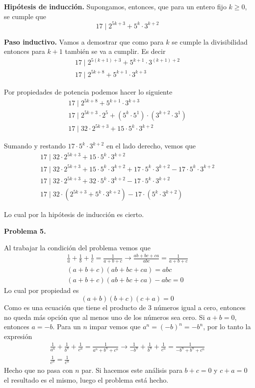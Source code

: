 \textbf{Hipótesis de inducción.} Supongamos, entonces, que para un entero fijo $k \geq 0$, se cumple que
\[17 \mid 2^{5k + 3} + 5^{k} \cdot 3^{k + 2}\]

\textbf{Paso inductivo.} Vamos a demostrar que como para $k$ se cumple la divisibilidad entonces para $k + 1$ también se va a cumplir.
Es decir
\begin{gather*}
    17 \mid 2^{5(k + 1) + 3} + 5^{k + 1} \cdot 3^{(k + 1) + 2}\\
    17 \mid 2^{5k + 8} + 5^{k + 1} \cdot 3^{k + 3}
\end{gather*}

Por propiedades de potencia podemos hacer lo siguiente
\begin{gather*}
    17 \mid 2^{5k + 8} + 5^{k + 1} \cdot 3^{k + 3}\\
    17 \mid 2^{5k + 3} \cdot 2^5 + (5^{k} \cdot 5^1) \cdot (3^{k + 2} \cdot 3^1)\\
    17 \mid 32\cdot 2^{5k + 3} + 15\cdot 5^{k} \cdot 3^{k + 2}
\end{gather*}

Sumando y restando $17\cdot 5^{k} \cdot 3^{k + 2}$ en el lado derecho, vemos que
\begin{gather*}
    17 \mid 32\cdot 2^{5k + 3} + 15\cdot 5^{k} \cdot 3^{k + 2} \\
    17 \mid 32\cdot 2^{5k + 3} + 15\cdot 5^{k} \cdot 3^{k + 2} + 17\cdot 5^{k} \cdot 3^{k + 2} - 17\cdot 5^{k} \cdot 3^{k + 2}\\
    17 \mid 32\cdot 2^{5k + 3} + 32\cdot 5^{k} \cdot 3^{k + 2} - 17\cdot 5^{k} \cdot 3^{k + 2}\\
    \boxed{17 \mid 32\cdot (2^{5k + 3} + 5^{k} \cdot 3^{k + 2}) - 17\cdot (5^{k} \cdot 3^{k + 2})}
\end{gather*}

Lo cual por la hipótesis de inducción es cierto.

\textbf{Problema 5.}

Al trabajar la condición del problema vemos que
\begin{gather*}
    \frac{1}{a} + \frac{1}{b} + \frac{1}{c} = \frac{1}{a + b + c}\rightarrow
    \frac{ab + bc + ca}{abc} = \frac{1}{a + b + c}\\
    (a + b + c)(ab + bc + ca) = abc\\
    (a + b + c)(ab + bc + ca) - abc = 0
\end{gather*}
Lo cual por propiedad es
\[(a + b)(b + c)(c + a) = 0\]
Como es una ecuación que tiene el producto de 3 números igual a cero, entonces no queda más opción que al menos uno de los números sea cero.
Si $a + b = 0$, entonces $a = -b$.
Para un $n$ impar vemos que $a^n = (-b)^n = - b^n$, por lo tanto la expresión
\begin{gather*}
    \frac{1}{a^n} + \frac{1}{b^n} + \frac{1}{c^n} = \frac{1}{a^n + b^n + c^n}\rightarrow
    \frac{1}{-b^n} + \frac{1}{b^n} + \frac{1}{c^n} = \frac{1}{-b^n + b^n + c^n}\\
    \boxed{\frac{1}{c^n} = \frac{1}{c^n}}
\end{gather*}
Hecho que no pasa con $n$ par.
Si hacemos este análisis para $b + c = 0$ y $c + a = 0$ el resultado es el mismo, luego el problema está hecho.